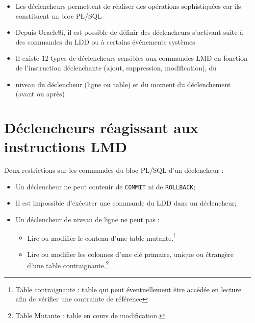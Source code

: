 \documentclass[10pt]{beamer}
\begin{document}
\begin{frame}{\secname}
    \begin{itemize}
        \item Les déclencheurs permettent de réaliser des opérations sophistiquées car ils constituent un bloc PL/SQL
        \item Depuis Oracle8i, il est possible de définir des déclencheurs s'activant suite à des commandes du LDD ou à certains événements systèmes
        \item Il existe 12 types de déclencheurs sensibles aux commandes LMD en fonction de l'instruction déclenchante (ajout, suppression, modification), du \item niveau du déclencheur (ligne ou table) et du moment du déclenchement (avant ou après)
    \end{itemize}
\end{frame}


\section{Déclencheurs réagissant aux instructions LMD}
\begin{frame}{\secname}
    
\end{frame}



\begin{frame}{\secname}
    Deux restrictions sur les commandes du bloc PL/SQL d'un déclencheur :
    \begin{itemize}
        \item Un déclencheur ne peut contenir de \lstinline[language=plsql]!COMMIT! ni de \lstinline[language=plsql]!ROLLBACK!;
        \item Il est impossible d'exécuter une commande du LDD dans un déclencheur;
        \item Un déclencheur  de niveau de ligne ne peut pas :
              \begin{itemize}
                  \item Lire ou modifier le contenu d'une table mutante.\footnote{Table contraignante : table qui peut éventuellement être accédée en lecture afin de vérifier une contrainte de référence}
                  \item Lire ou modifier les colonnes d'une clé primaire, unique ou étrangère d'une table contraignante.\footnote{Table Mutante : table en cours de modification. }
              \end{itemize}
    \end{itemize}
\end{frame}
\end{document}
